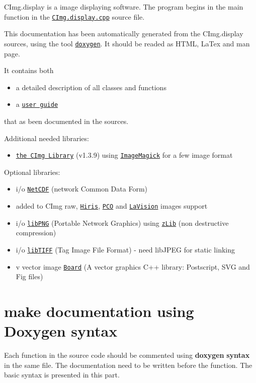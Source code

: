 \par
 CImg.display is a image displaying software. The program begins in the main function in the \href{CImg_8display_8cpp.html}{\tt CImg.display.cpp} source file.\par
\par
 This documentation has been automatically generated from the CImg.display sources, using the tool \href{http://www.doxygen.org}{\tt doxygen}. It should be readed as HTML, LaTex and man page.\par
 It contains both \begin{itemize}
\item a detailed description of all classes and functions \item a \href{user.html}{\tt user guide}\end{itemize}
that as been documented in the sources.

\begin{Desc}
\item[Additional needed libraries:]\end{Desc}
\begin{itemize}
\item \href{http://cimg.sourceforge.net}{\tt the CImg Library} (v1.3.9) using \href{http://www.imagemagick.org/}{\tt ImageMagick} for a few image format\end{itemize}
\begin{Desc}
\item[Optional libraries:]\end{Desc}
\begin{itemize}
\item i/o \href{http://www.unidata.ucar.edu/software/netcdf/}{\tt NetCDF} (network Common Data Form) \item added to CImg raw, \href{http://www.rd-vision.com/}{\tt Hiris}, \href{http://www.pco.de/}{\tt PCO} and \href{http://www.lavision.de}{\tt LaVision} images support \item i/o \href{http://www.libpng.org/}{\tt libPNG} (Portable Network Graphics) using \href{http://www.zlib.net/}{\tt zLib} (non destructive compression) \item i/o \href{http://www.libtiff.org/}{\tt libTIFF} (Tag Image File Format) - need libJPEG for static linking \item v vector image \href{http://libboard.sourceforge.net/}{\tt Board} (A vector graphics C++ library: Postscript, SVG and Fig files)\end{itemize}
\hypertarget{index_sectionDoxygenSyntax}{}\section{make documentation using Doxygen syntax}\label{index_sectionDoxygenSyntax}
Each function in the source code should be commented using {\bf doxygen} {\bf syntax} in the same file. The documentation need to be written before the function. The basic syntax is presented in this part. 

